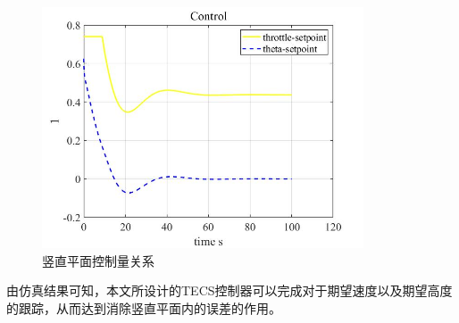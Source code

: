 \begin{figure}[H]
    \centering
    \includegraphics[width=0.85\textwidth]{figures/c5/c5-TECS-control.jpg}
    \caption{竖直平面控制量关系}\label{fig:c5-TECS-control}
\end{figure}
由仿真结果可知，本文所设计的TECS控制器可以完成对于期望速度以及期望高度的跟踪，从而达到消除竖直平面内的误差的作用。
